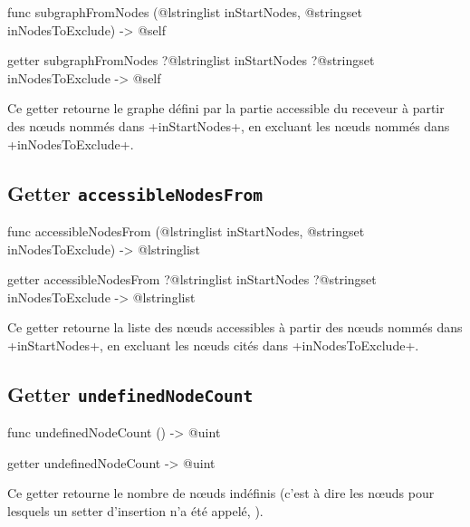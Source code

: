 \begin{galgas4}
func subgraphFromNodes (@lstringlist inStartNodes,
                        @stringset inNodesToExclude) -> @self
\end{galgas4}

\begin{galgas3}
getter subgraphFromNodes ?@lstringlist inStartNodes
                         ?@stringset inNodesToExclude -> @self
\end{galgas3}

Ce getter retourne le graphe défini par la partie accessible du receveur à partir des nœuds nommés dans \ggst+inStartNodes+, en excluant les nœuds nommés dans \ggst+inNodesToExclude+.






\subsection{Getter \texttt{accessibleNodesFrom}}

\begin{galgas4}
func accessibleNodesFrom (@lstringlist inStartNodes,
                          @stringset inNodesToExclude) -> @lstringlist
\end{galgas4}

\begin{galgas3}
getter accessibleNodesFrom ?@lstringlist inStartNodes
                           ?@stringset inNodesToExclude -> @lstringlist
\end{galgas3}

Ce getter retourne la liste des nœuds accessibles à partir des nœuds nommés dans \ggst+inStartNodes+, en excluant les nœuds cités dans \ggst+inNodesToExclude+.






\subsection{Getter \texttt{undefinedNodeCount}}

\begin{galgas4}
func undefinedNodeCount () -> @uint
\end{galgas4}

\begin{galgas3}
getter undefinedNodeCount -> @uint
\end{galgas3}

Ce getter retourne le nombre de nœuds indéfinis (c'est à dire les nœuds pour lesquels un setter d'insertion n'a été appelé, ).







